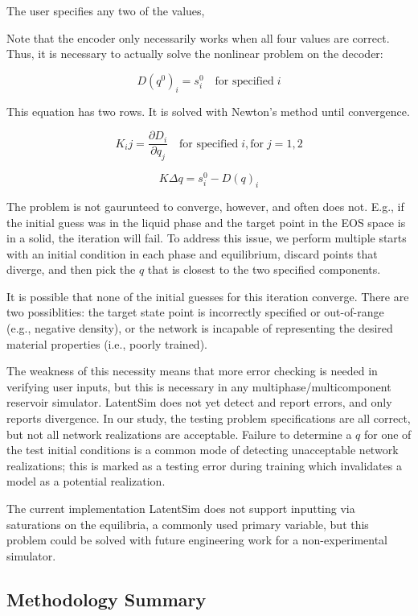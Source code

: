 \documentclass[]{article}
\begin{document}
The user specifies any two of the values,

Note that the encoder only necessarily works when all four values are
correct. Thus, it is necessary to actually solve the nonlinear problem
on the decoder:

\[D(q^0)_i = s^0_i \quad \text{for specified}\; i\]

This equation has two rows. It is solved with Newton's method until
convergence.

\[K_ij = \frac{\partial D_i}{\partial q_j}  \quad \text{for specified}\; i, \text{for}\;j=1,2\]

\[K\Delta q = s^0_i-D(q)_i\]

The problem is not gaurunteed to converge, however, and often does not.
E.g., if the initial guess was in the liquid phase and the target point
in the EOS space is in a solid, the iteration will fail. To address this
issue, we perform multiple starts with an initial condition in each
phase and equilibrium, discard points that diverge, and then pick the
\(q\) that is closest to the two specified components.

It is possible that none of the initial guesses for this iteration
converge. There are two possiblities: the target state point is
incorrectly specified or out-of-range (e.g., negative density), or the
network is incapable of representing the desired material properties
(i.e., poorly trained).

The weakness of this necessity means that more error checking is needed
in verifying user inputs, but this is necessary in any
multiphase/multicomponent reservoir simulator. LatentSim does not yet
detect and report errors, and only reports divergence. In our study, the
testing problem specifications are all correct, but not all network
realizations are acceptable. Failure to determine a \(q\) for one of the
test initial conditions is a common mode of detecting unacceptable
network realizations; this is marked as a testing error during training
which invalidates a model as a potential realization.

The current implementation LatentSim does not support inputting via
saturations on the equilibria, a commonly used primary variable, but
this problem could be solved with future engineering work for a
non-experimental simulator.

\hypertarget{header-n3493}{%
\subsection{Methodology Summary}\label{header-n3493}}
\end{document}
